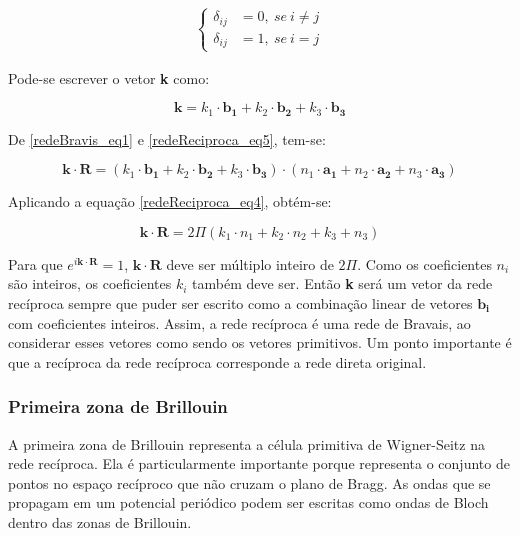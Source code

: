       \begin{align}\label{delta_kronecker_sistema}
        \left\{
          \begin{array}{ll}
            \displaystyle \delta_{ij} &= 0,\ se \ i\neq j\\
            \displaystyle \delta_{ij} &= 1,\ se \ i = j
          \end{array}
        \right.
      \end{align}

      \par Pode-se escrever o vetor \textbf{k} como:

      \begin{equation}\label{redeReciproca_eq5}
        \mathbf{k} = k_{1}\cdot \mathbf{b_{1}} + k_{2}\cdot \mathbf{b_{2}} + k_{3}\cdot \mathbf{b_{3}}
      \end{equation}

      \par De \eqref{redeBravis_eq1} e \eqref{redeReciproca_eq5}, tem-se:

      \begin{equation}\label{redeReciproca_eq6}
        \mathbf{k} \cdot \mathbf{R} = (k_{1} \cdot \mathbf{b_{1}} + k_{2} \cdot \mathbf{b_{2}} + k_{3} \cdot \mathbf{b_{3}})\cdot(n_{1} \cdot \mathbf{a_{1}} + n_{2} \cdot \mathbf{a_{2}} + n_{3} \cdot \mathbf{a_{3}})
      \end{equation}

      \par Aplicando a equação \eqref{redeReciproca_eq4}, obtém-se:

      \begin{equation}\label{redeReciproca_eq6}
        \mathbf{k} \cdot \mathbf{R} = 2 \Pi (k_{1} \cdot n_{1} + k_{2} \cdot n_{2} + k_{3} + n_{3})
      \end{equation}

      \par Para que $e^{i\mathbf{k} \cdot \mathbf{R}} = 1$, $\mathbf{k} \cdot \mathbf{R}$ deve ser múltiplo inteiro de $2 \Pi$. Como os coeficientes $n_{i}$ são inteiros, os coeficientes $k_{i}$ também deve ser. Então \textbf{k} será um vetor da rede recíproca sempre que puder ser escrito como a combinação linear de vetores $\mathbf{b_{i}}$ com coeficientes inteiros. Assim, a rede recíproca é uma rede de Bravais, ao considerar esses vetores como sendo os vetores primitivos. Um ponto importante é que a recíproca da rede recíproca corresponde a rede direta original.\cite{qm_fis5}

    \subsubsection{Primeira zona de Brillouin}

      A primeira zona de Brillouin representa a célula primitiva de Wigner-Seitz na rede recíproca. Ela é particularmente importante porque representa o conjunto de pontos no espaço recíproco que não cruzam o plano de Bragg. As ondas que se propagam em um potencial periódico podem ser escritas como ondas de Bloch dentro das zonas de Brillouin.\cite{qm_fis6}